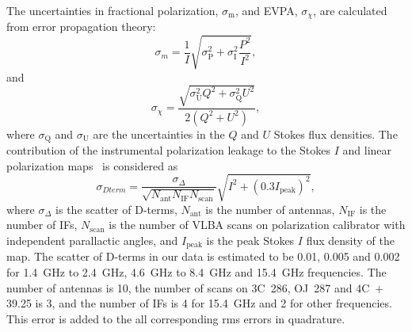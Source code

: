 \documentclass[a4paper,fleqn,usenatbib,useAMS]{mnras}
\begin{document}
The uncertainties in fractional polarization, $\sigma_\mathrm{m}$, and EVPA, $\sigma_{\chi}$, are calculated from error propagation theory:
\begin{equation}
\sigma_m = \frac{1}{I}\sqrt{\sigma_\mathrm{P}^2+\sigma_\mathrm{I}^2\frac{P^2}{I^2}},
\end{equation}
and 
\begin{equation}
\sigma_{\chi} = \frac{\sqrt{\sigma_\mathrm{U}^2 Q^2+\sigma_\mathrm{Q}^2 U^2}}{{2(Q^2+U^2)}},
\end{equation}
where $\sigma_\mathrm{Q}$ and $\sigma_\mathrm{U}$ are the uncertainties in the $Q$ and $U$ Stokes flux densities.
The contribution of the instrumental polarization leakage to the Stokes $I$ and linear polarization maps~\citep{roberts_etal94,hovatta_etal12} is considered as
\begin{equation}
\sigma_{Dterm} = \frac{\sigma_{\Delta}}{\sqrt{N_\mathrm{ant} N_\mathrm{IF} N_\mathrm{scan}}}\sqrt{I^2+(0.3 I_\mathrm{peak})^2},
\end{equation}
where $\sigma_{\Delta}$ is the scatter of D-terms, $N_\mathrm{ant}$ is the number of antennas, $N_\mathrm{IF}$ is the number of IFs, $N_\mathrm{scan}$ is the number of VLBA scans on polarization calibrator with independent parallactic angles, and $I_\mathrm{peak}$ is the peak Stokes $I$ flux density of the map. 
The scatter of D-terms in our data is estimated to be 0.01, 0.005 and 0.002 for 1.4~GHz to 2.4~GHz, 4.6~GHz to 8.4~GHz and 15.4~GHz frequencies. 
The number of antennas is 10, the number of scans on 3C~286, OJ~287 and 4C~$+$39.25 is 3, and the number of IFs is 4 for 15.4~GHz and 2 for other frequencies. 
This error is added to the all corresponding rms errors in quadrature.
\end{document}
